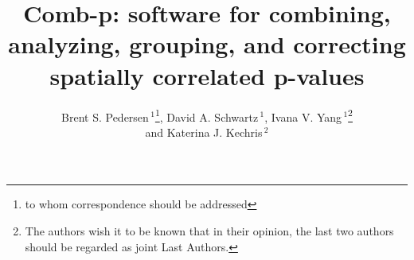 \documentclass{bioinfo}
\begin{document}

\title[comb-p]{Comb-p: software for combining, analyzing, grouping, and correcting spatially correlated p-values}
\author[Pedersen \textit{et~al}]{Brent S. Pedersen\,$^1$\footnote{to whom correspondence should be addressed},
 David A. Schwartz\,$^1$,
    Ivana V. Yang\,$^1$\footnote{The authors wish it to be known that in their opinion,
the last two authors should be regarded as joint Last Authors.}

and Katerina J.  Kechris\,$^2$\footnotemark[2]{}

}

\address{$^{1}$Department of Medicine, University of Colorado, Denver, Anschutz Medical Campus, Aurora CO 80045,
USA\\
$^{2}$Department of Statistics, University of Colorado, Denver, Anschutz Medical Campus, Aurora CO 80045, USA\\
}
\end{document}
